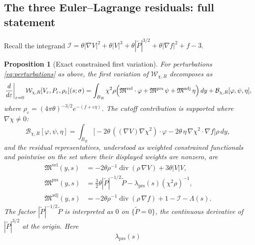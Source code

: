 \documentclass[11pt]{amsart}
\numberwithin{equation}{section}
\theoremstyle{plain}
\newtheorem{proposition}[theorem]{Proposition}
\theoremstyle{definition}
\theoremstyle{remark}
\newcommand{\Wloc}{\mathcal W}
\newcommand{\diver}{\operatorname{div}}
\begin{document}
\subsection{The three Euler--Lagrange residuals: full statement}

Recall the integrand
\(\mathcal I=\theta|\nabla V|^2+\theta|V|^3+\theta|\widetilde P|^{3/2}
+\theta|\nabla f|^2+f-3\).

\begin{proposition}[Exact constrained first variation]
\label{prop:principal-part}
For perturbations \eqref{eq:perturbations} as above, the first variation of
\(\Wloc_{\chi,R}\) decomposes as
\begin{equation}\label{eq:first-variation-identity}
	\left.\frac{d}{d\varepsilon}\right|_{\varepsilon=0}
	\Wloc_{\chi,R}[V_\varepsilon,P_\varepsilon,\rho_\varepsilon](s;\sigma)
	= \int_{B_R}\chi^2\rho
	\Bigl(
			\mathfrak M^{\mathrm{vel}}\cdot\varphi
		+ \mathfrak M^{\mathrm{prs}}\,\psi
		+ \mathfrak M^{\mathrm{adj}}\,\eta
	\Bigr)\,dy
	+ \mathcal B_{\chi,R}[\varphi,\psi,\eta],
\end{equation}
where \(\rho_\varepsilon=(4\pi\theta)^{-3/2}e^{-(f+\varepsilon\eta)}\).  The
cutoff contribution is supported where \(\nabla\chi\ne0\):
\begin{equation}\label{eq:cB-explicit}
	\mathcal B_{\chi,R}[\varphi,\psi,\eta]
	=\int_{B_R}
	\bigl[
	-2\theta\,((\nabla V)\nabla\chi^2)\cdot\varphi
	-2\theta\,\eta\,\nabla\chi^2\cdot\nabla f
	\bigr]\rho\,dy,
\end{equation}
and the residual representatives, understood as weighted constrained
functionals and pointwise on the set where their displayed weights are
nonzero, are
\begin{align}
	\mathfrak M^{\mathrm{vel}}(y,s)
	&=-2\theta\rho^{-1}\diver(\rho\,\nabla V)+3\theta|V|V,
	\label{eq:vel-principal-full}\\[4pt]
	\mathfrak M^{\mathrm{prs}}(y,s)
	&=\tfrac32\theta|\widetilde P|^{-1/2}\widetilde P
	-\lambda_{\mathrm{prs}}(s)(\chi^2\rho)^{-1},
	\label{eq:prs-principal-full}\\[4pt]
	\mathfrak M^{\mathrm{adj}}(y,s)
	&=-2\theta\rho^{-1}\diver(\rho\,\nabla f)
	+1-\mathcal I-\Lambda(s).
	\label{eq:adj-principal-full}
\end{align}
The factor \( |\widetilde P|^{-1/2}\widetilde P\) is interpreted as \(0\)
on \(\{\widetilde P=0\}\), the continuous derivative of
\(|\widetilde P|^{3/2}\) at the origin.
Here
\begin{equation}\label{eq:lambda-prs-def}
	\lambda_{\mathrm{prs}}(s)

\end{equation}
\end{proposition}
\end{document}

